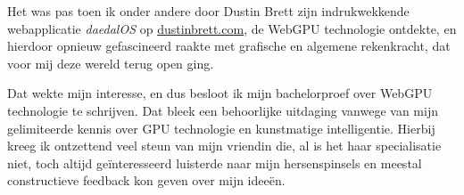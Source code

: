 \bigbreak{}

Het was pas toen ik onder andere door Dustin Brett zijn indrukwekkende webapplicatie \textit{daedalOS} op \href{https://dustinbrett.com/}{dustinbrett.com}, de WebGPU technologie ontdekte, en hierdoor opnieuw gefascineerd raakte met grafische en algemene rekenkracht, dat voor mij deze wereld terug open ging.

\bigbreak{}

Dat wekte mijn interesse, en dus besloot ik mijn bachelorproef over WebGPU technologie te schrijven. Dat bleek een behoorlijke uitdaging vanwege van mijn gelimiteerde kennis over GPU technologie en kunstmatige intelligentie. Hierbij kreeg ik ontzettend veel steun van mijn vriendin die, al is het haar specialisatie niet, toch altijd geïnteresseerd luisterde naar mijn hersenspinsels en meestal constructieve feedback kon geven over mijn ideeën.
